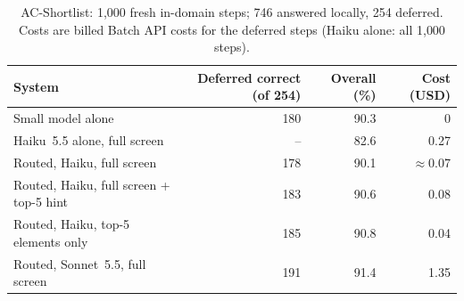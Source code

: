 \documentclass[10pt]{article}
\begin{document}
\begin{table}[t]\centering\small
\caption{AC-Shortlist: 1{,}000 fresh in-domain steps; 746 answered locally, 254 deferred. Costs are billed Batch API costs for the deferred steps (Haiku alone: all 1{,}000 steps).}\label{tab:sl}
\begin{tabular}{lrrr}\toprule
System & Deferred correct (of 254) & Overall (\%) & Cost (USD)\\\midrule
Small model alone & 180 & 90.3 & 0\\
Haiku~5.5 alone, full screen & -- & 82.6 & 0.27\\
Routed, Haiku, full screen & 178 & 90.1 & $\approx$0.07\\
Routed, Haiku, full screen + top-5 hint & 183 & 90.6 & 0.08\\
Routed, Haiku, top-5 elements only & 185 & 90.8 & 0.04\\
Routed, Sonnet~5.5, full screen & 191 & 91.4 & 1.35\\\bottomrule
\end{tabular}\end{table}
\end{document}
